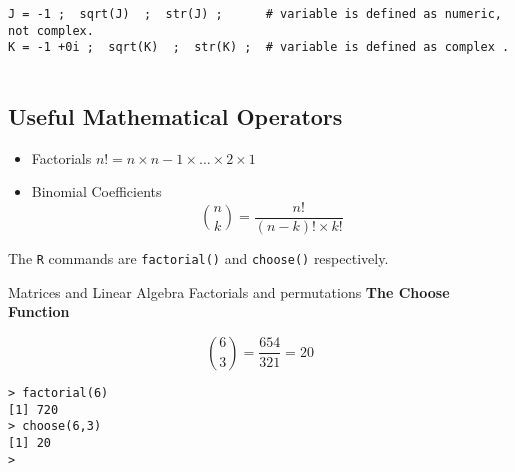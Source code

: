 \documentclass[a4paper,12pt]{article}
\begin{document}
\begin{framed}
\begin{verbatim}
J = -1 ;  sqrt(J)  ;  str(J) ;      # variable is defined as numeric, not complex.
K = -1 +0i ;  sqrt(K)  ;  str(K) ;  # variable is defined as complex .


\end{verbatim}
\end{framed}








\subsection{Useful Mathematical Operators}

\begin{itemize}
	\item Factorials
	$n! = n \times n-1 \times \ldots \times 2 \times 1 $
	\item Binomial Coefficients
	\[ { n \choose k }  = \frac{n!}{(n-k)! \times k!}\]
\end{itemize}
The \texttt{R} commands are \texttt{factorial()} and \texttt{choose()} respectively.

Matrices and Linear Algebra
Factorials and permutations
\textbf{The Choose Function}

\[ { 6 \choose 3} =\frac{654}{321}= 20\]


\begin{framed}
\begin{verbatim}
> factorial(6)
[1] 720
> choose(6,3)
[1] 20
> 
\end{verbatim}
\end{framed}

\end{document}
